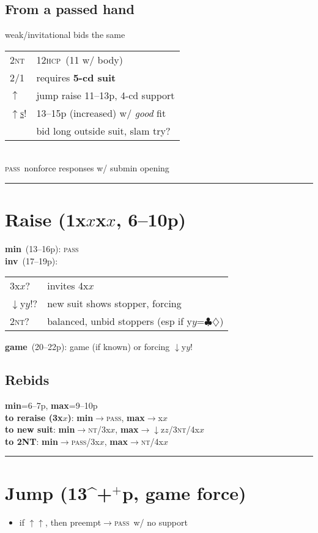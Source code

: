 \documentclass[landscape]{article}
\newcommand{\optionalmath}[1]{\ifmmode#1\else$#1$\fi}
\let\mathto\to
\def\to{\optionalmath\mathto}
\def\+{\optionalmath{^+}}
\def\C{\optionalmath\clubsuit}
\def\D{\optionalmath\diamondsuit}
\def\NT{\ifmmode\mathsc{nt}\else\textsc{nt}\fi}
\def\HCP{\textsc{hcp}}
\def\P{\textsc{pass}}
\def\s{\textsc{s}}
\def\x{\optionalmath x}
\def\y{\optionalmath y}
\def\z{\optionalmath z}
\def\ks{\kern2pt\s\kern2pt}
\def\li{\indent\phantom{li}}
\def\force{!}
\def\inv{?}
\def\nojump{\optionalmath\downarrow}
\def\jump{\optionalmath\uparrow}
\def\bmin{\textbf{min}}
\def\binv{\textbf{inv}}
\def\bgame{\textbf{game}}
\def\bmax{\textbf{max}}
\def\setcc#1#2{\def\cc{\crunch[#1]}\def\cca{\crunch[#2]}}
\newcommand{\crunch}[1][.6]{\vspace*{-#1pc}}
\renewcommand{\bullet}[1]{\begin{itemize}\item#1\end{itemize}}
\def\unbid#1{\uline{#1}}
\def\raise#1{\uwave{#1}}
\newenvironment{column}[1][0.33]{\begin{minipage}[t]{#1\columnwidth}}{\end{minipage}}
\begin{document}
\begin{column}\setcc{.5}{.2}

\subsection{From a passed hand}\cca
\li weak/invitational bids the same\\
\begin{tabular}{ll}
  2\NT & 12\HCP\ (11 w/ body)\\
  2/1  & requires \textbf{5-cd suit}\\
  \jump\raise{\ks} & jump raise 11--13p, 4-cd support\\
  \jump\unbid\s\force & 13--15p (increased) w/ \emph{good} fit\\
                      & bid long outside suit, slam try?
\end{tabular}\\
\li \P\ nonforce responses w/ submin opening

\crunch[-.8]\hrule

\cc\section{Raise (1\x-2\x, 6--10p)}\cca
\bmin\ (13--16p): \P\\
\binv\ (17--19p):\\
\begin{tabular}{ll}
  3\x\inv  & invites 4\x\\
  \nojump\y\force\inv & new suit shows stopper, forcing\\
  2\NT\inv & balanced, unbid stoppers (esp if \y=\C\D)\\
\end{tabular}
\bgame\ (20--22p): game (if known) or forcing \nojump\y\force

\cc\subsection{Rebids}\cca
\bmin=6--7p, \bmax=9--10p\\[6pt]
\textbf{to reraise (3\x)}: \bmin\to\P, \bmax\to4\x\\
\textbf{to new suit}: \bmin\to2\NT/3\x, \bmax\to\nojump\z/3\NT/4\x\\
\textbf{to 2NT}: \bmin\to\P/3\x, \bmax\to3\NT/4\x\\

\crunch[-.8]\hrule

\cc\section{Jump (13\+p, game force)}\cca
\bullet{if \jump\jump, then preempt\to\P\ w/ no support}


\end{column}
\end{document}
